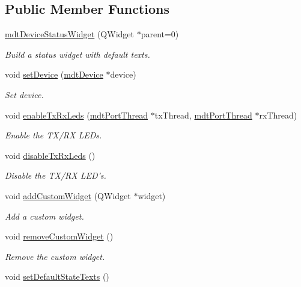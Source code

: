 \subsection*{Public Member Functions}
\begin{DoxyCompactItemize}
\item 
\hypertarget{classmdt_device_status_widget_ad1dd6b00c3ef394b4dc2bea36bcd4462}{
\hyperlink{classmdt_device_status_widget_ad1dd6b00c3ef394b4dc2bea36bcd4462}{mdtDeviceStatusWidget} (QWidget $\ast$parent=0)}
\label{classmdt_device_status_widget_ad1dd6b00c3ef394b4dc2bea36bcd4462}

\begin{DoxyCompactList}\small\item\em Build a status widget with default texts. \end{DoxyCompactList}\item 
void \hyperlink{classmdt_device_status_widget_ac7b010932ee6c83ffc9efe006ee13f22}{setDevice} (\hyperlink{classmdt_device}{mdtDevice} $\ast$device)
\begin{DoxyCompactList}\small\item\em Set device. \end{DoxyCompactList}\item 
void \hyperlink{classmdt_device_status_widget_a056af69761b82cd24ab653158beafa22}{enableTxRxLeds} (\hyperlink{classmdt_port_thread}{mdtPortThread} $\ast$txThread, \hyperlink{classmdt_port_thread}{mdtPortThread} $\ast$rxThread)
\begin{DoxyCompactList}\small\item\em Enable the TX/RX LEDs. \end{DoxyCompactList}\item 
\hypertarget{classmdt_device_status_widget_a042461c9fd28d3f4f29ffad730ec7073}{
void \hyperlink{classmdt_device_status_widget_a042461c9fd28d3f4f29ffad730ec7073}{disableTxRxLeds} ()}
\label{classmdt_device_status_widget_a042461c9fd28d3f4f29ffad730ec7073}

\begin{DoxyCompactList}\small\item\em Disable the TX/RX LED's. \end{DoxyCompactList}\item 
void \hyperlink{classmdt_device_status_widget_ae3df9a41c4bff87b81101a5ad4b9dd0a}{addCustomWidget} (QWidget $\ast$widget)
\begin{DoxyCompactList}\small\item\em Add a custom widget. \end{DoxyCompactList}\item 
void \hyperlink{classmdt_device_status_widget_a30015d4d648425da6a8cef72e18afd8a}{removeCustomWidget} ()
\begin{DoxyCompactList}\small\item\em Remove the custom widget. \end{DoxyCompactList}\item 
\hypertarget{classmdt_device_status_widget_aaaac01ef5272b66bc0a3daf19e20047c}{
void \hyperlink{classmdt_device_status_widget_aaaac01ef5272b66bc0a3daf19e20047c}{setDefaultStateTexts} ()}
\label{classmdt_device_status_widget_aaaac01ef5272b66bc0a3daf19e20047c}


\end{DoxyCompactItemize}
